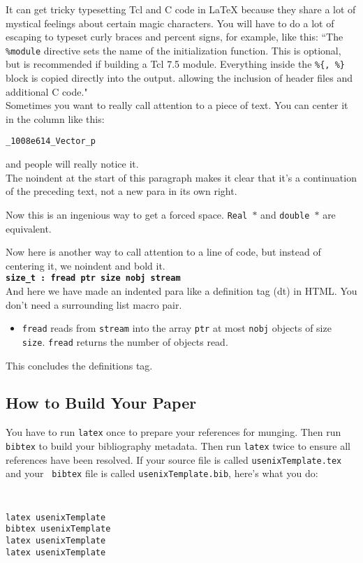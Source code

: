 \documentclass[letterpaper,twocolumn,10pt]{article}
\begin{document}
It can get tricky typesetting Tcl and C code in LaTeX because they share
a lot of mystical feelings about certain magic characters.  You
will have to do a lot of escaping to typeset curly braces and percent
signs, for example, like this:
``The {\tt \%module} directive
sets the name of the initialization function.  This is optional, but is
recommended if building a Tcl 7.5 module.
Everything inside the {\tt \%\{, \%\}}
block is copied directly into the output. allowing the inclusion of
header files and additional C code." \\

Sometimes you want to really call attention to a piece of text.  You
can center it in the column like this:
\begin{center}
{\tt \_1008e614\_Vector\_p}
\end{center}
and people will really notice it.\\

\noindent
The noindent at the start of this paragraph makes it clear that it's
a continuation of the preceding text, not a new para in its own right.


Now this is an ingenious way to get a forced space.
{\tt Real~$*$} and {\tt double~$*$} are equivalent. 

Now here is another way to call attention to a line of code, but instead
of centering it, we noindent and bold it.\\

\noindent
{\bf \tt size\_t : fread ptr size nobj stream } \\

And here we have made an indented para like a definition tag (dt)
in HTML.  You don't need a surrounding list macro pair.
\begin{itemize}
\item[]  {\tt fread} reads from {\tt stream} into the array {\tt ptr} at
most {\tt nobj} objects of size {\tt size}.   {\tt fread} returns
the number of objects read. 
\end{itemize}
This concludes the definitions tag.

\subsection{How to Build Your Paper}

You have to run {\tt latex} once to prepare your references for
munging.  Then run {\tt bibtex} to build your bibliography metadata.
Then run {\tt latex} twice to ensure all references have been resolved.
If your source file is called {\tt usenixTemplate.tex} and your {\tt
  bibtex} file is called {\tt usenixTemplate.bib}, here's what you do:
{\tt \small
\begin{verbatim}
latex usenixTemplate
bibtex usenixTemplate
latex usenixTemplate
latex usenixTemplate
\end{verbatim}
}
\end{document}
